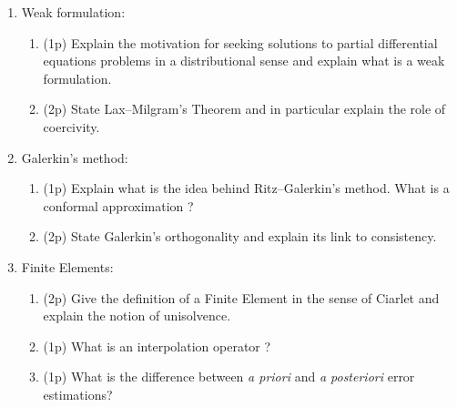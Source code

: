 \documentclass[assignment]{tmanotes}
\begin{document}
\begin{enumerate}
\item Weak formulation:
\begin{enumerate}
\item (1p) Explain the motivation for seeking solutions to partial differential equations problems in a distributional sense and explain what is a weak formulation.
\item (2p) State Lax--Milgram's Theorem and in particular explain the role of coercivity.
\end{enumerate}
\item Galerkin's method:
\begin{enumerate}
\vspace{0.1in}
\item (1p) Explain what is the idea behind Ritz--Galerkin's method. What is a conformal approximation ?
\item (2p) State Galerkin's orthogonality and explain its link to consistency.
\end{enumerate}

\item Finite Elements:
\begin{enumerate}
\item (2p) Give the definition of a Finite Element in the sense of Ciarlet and explain the notion of unisolvence.
\item (1p) What is an interpolation operator ?
\vspace{0.1in}
\item (1p) What is the difference between \textit{a priori} and \textit{a posteriori} error estimations?

\end{enumerate}
\end{enumerate}


\end{document}
